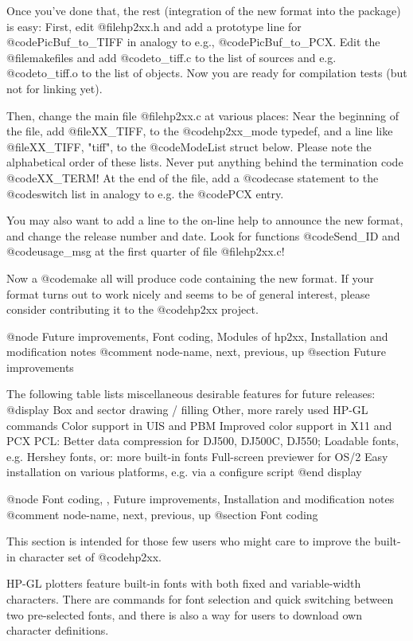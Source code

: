 Once you've done that, the rest (integration of the new format into the
package) is easy: First, edit @file{hp2xx.h} and add a prototype
line for @code{PicBuf_to_TIFF} in analogy to e.g., @code{PicBuf_to_PCX}.
Edit the @file{makefile}s and add @code{to_tiff.c} to the list of sources
and e.g. @code{to_tiff.o} to the list of objects. Now you are ready for
compilation tests (but not for linking yet).

Then, change the main file @file{hp2xx.c} at various places: Near the
beginning of the file, add @file{XX_TIFF, } to the @code{hp2xx_mode} typedef,
and a line like @file{XX_TIFF,   "tiff", } to the @code{ModeList} struct below.
Please note the alphabetical order of these lists. Never put anything behind
the termination code @code{XX_TERM}! At the end of the file,
add a @code{case} statement to the @code{switch} list in analogy to e.g.
the @code{PCX} entry.

You may also want to add a line to the on-line help to
announce the new format, and change the release number and date.
Look for functions @code{Send_ID} and @code{usage_msg} at the first quarter
of file @file{hp2xx.c}!

Now a @code{make all} will produce code containing the new format.
If your format turns out to work nicely and seems to be of general interest,
please consider contributing it to the @code{hp2xx} project.



@node Future improvements, Font coding, Modules of hp2xx, Installation and modification notes
@comment  node-name,  next,  previous,  up
@section Future improvements

The following table lists miscellaneous desirable features for future
releases:
@display
  Box and sector drawing / filling
  Other, more rarely used HP-GL commands
  Color support in UIS and PBM
  Improved color support in X11 and PCX
  PCL: Better data compression for DJ500, DJ500C, DJ550;
  Loadable fonts, e.g. Hershey fonts, or: more built-in fonts
  Full-screen previewer for OS/2
  Easy installation on various platforms, e.g. via a configure script
@end display


@node Font coding, , Future improvements, Installation and modification notes
@comment  node-name,  next,  previous,  up
@section Font coding

This section is intended for those few users who might care to
improve the built-in character set of @code{hp2xx}.

HP-GL plotters feature built-in fonts with both fixed and
variable-width characters. There are commands for font selection
and quick switching between two pre-selected fonts, and there
is also a way for users to download own character definitions.

